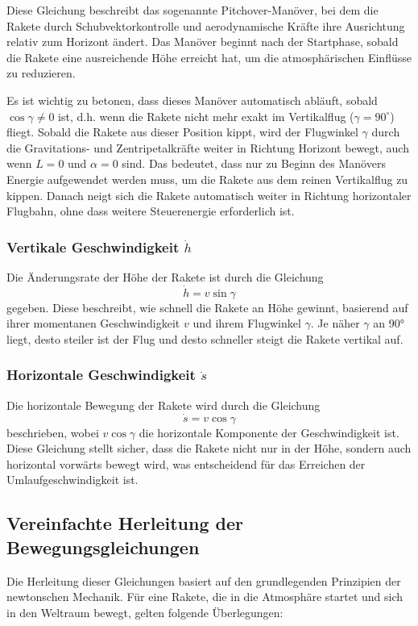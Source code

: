 Diese Gleichung beschreibt das sogenannte Pitchover-Manöver, bei dem die Rakete durch Schubvektorkontrolle und aerodynamische Kräfte ihre Ausrichtung relativ zum Horizont ändert. 
%
%
Das Manöver beginnt nach der Startphase, sobald die Rakete eine ausreichende Höhe erreicht hat, um die atmosphärischen Einflüsse zu reduzieren.

Es ist wichtig zu betonen, dass dieses Manöver automatisch abläuft, sobald \(\cos \gamma \neq 0\) ist, d.h. wenn die Rakete nicht mehr exakt im Vertikalflug (\(\gamma = 90^\circ\)) fliegt. 
Sobald die Rakete aus dieser Position kippt, wird der Flugwinkel \(\gamma\) durch die Gravitations- und Zentripetalkräfte weiter in Richtung Horizont bewegt, auch wenn \(L = 0\) und \( \alpha = 0\) sind. 
Das bedeutet, dass nur zu Beginn des Manövers Energie aufgewendet werden muss, um die Rakete aus dem reinen Vertikalflug zu kippen. 
Danach neigt sich die Rakete automatisch weiter in Richtung horizontaler Flugbahn, ohne dass weitere Steuerenergie erforderlich ist.


\subsubsection{Vertikale Geschwindigkeit \(\dot{h}\)}
Die Änderungsrate der Höhe der Rakete ist durch die Gleichung
\[
\dot{h} = v \sin \gamma
\]
gegeben. 
Diese beschreibt, wie schnell die Rakete an Höhe gewinnt, basierend auf ihrer momentanen Geschwindigkeit \(v\) und ihrem Flugwinkel \(\gamma\). 
Je näher \(\gamma\) an 90° liegt, desto steiler ist der Flug und desto schneller steigt die Rakete vertikal auf.

\subsubsection{Horizontale Geschwindigkeit \(\dot{s}\)}
Die horizontale Bewegung der Rakete wird durch die Gleichung
\[
\dot{s} = v \cos \gamma
\]
beschrieben, wobei \(v \cos \gamma\) die horizontale Komponente der Geschwindigkeit ist. 
Diese Gleichung stellt sicher, dass die Rakete nicht nur in der Höhe, sondern auch horizontal vorwärts bewegt wird, was entscheidend für das Erreichen der Umlaufgeschwindigkeit ist.

\subsection{Vereinfachte Herleitung der Bewegungsgleichungen}
Die Herleitung dieser Gleichungen basiert auf den grundlegenden
Prinzipien der newtonschen Mechanik.
Für eine Rakete, die in die Atmosphäre startet und sich in den
Weltraum bewegt, gelten folgende Überlegungen:

